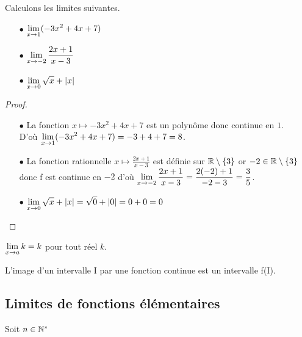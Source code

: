 \begin{exercice} 
 Calculons les limites suivantes.
 
\begin{itemize}
\item[$  \bullet$] $ \displaystyle \lim_{x\to 1}(-3x^{2}+4x+7)$ 
 \item[$  \bullet$] $\displaystyle \lim_{x\to -2}\frac{2x+1}{x-3} $
 \item[$  \bullet$] $\displaystyle \lim_{x\to 0}\sqrt{x} +\left\lvert x \right\rvert $
  \end{itemize}

\end{exercice}




 \begin{proof}
 
\begin{itemize}
\item[$  \bullet$]  La fonction $ x\longmapsto  -3x^{2}+4x+7$ est  un polynôme donc continue en  $ 1 $.\\ D'où $ \displaystyle \lim_{x\to 1}(-3x^{2}+4x+7)= -3+4+7=8$. 
\item[$  \bullet$]  La fonction  rationnelle $ x\longmapsto \frac{2x+1}{x-3}  $ est  définie sur $ \mathbb{R}\setminus\left\{3\right\} $   or    $ -2\in \mathbb{R}\setminus\left\{3\right\} $ donc f est continue en $ -2 $  \;  d'où \;  $\displaystyle \lim_{x\to -2}\frac{2x+1}{x-3}=\frac{2(-2)+1}{-2-3}  =\frac{3}{5}$.
\item[$  \bullet$] $\displaystyle \lim_{x\to 0}\sqrt{x} +\left\lvert x \right\rvert=\sqrt{0}+\left\lvert 0 \right\rvert=0+0=0 $
     
\end{itemize}

\end{proof}
 \begin{remark}

$\displaystyle \lim_{x\to a}k=k $  pour tout réel $ k. $
\end{remark}
  
\begin{property}
L'image d'un intervalle I par une fonction continue est un
intervalle f(I).

\end{property}

\subsection*{Limites de fonctions élémentaires}
\medskip

Soit $ n\in\mathbb{N}^* $



